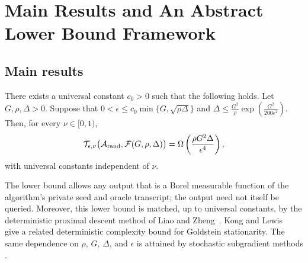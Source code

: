\section{Main Results and An Abstract Lower Bound Framework}
 \label{sec:main}
\subsection{Main results}
\begin{theorem}
\label{thm:main}
There exists a universal constant $c_0>0$ such that the following holds.
Let $G,\rho, \Delta>0$. Suppose that $0<\epsilon\le c_0\min\{G,\sqrt{\rho\Delta}\}$ and $\Delta\leq\tfrac{G^2}{\rho}
       \exp\left(\tfrac{G^2}{200\epsilon^2}\right)$. 
Then, for every $\nu\in[0,1)$,
\[
\mathcal T_{\epsilon,\nu}
\bigl(\mathcal A_{\operatorname{rand}},\mathcal F(G,\rho,\Delta)\bigr)
=
\Omega\left(\frac{\rho G^2\Delta}{\epsilon^4}\right),
\]
with universal  constants independent of $\nu$. 
\end{theorem}
The lower bound allows any output that is a Borel measurable
function of the algorithm's private seed and oracle transcript;
the output need not itself be queried.
Moreover, this lower bound is matched, up to universal constants, by
the deterministic proximal descent method of
Liao and Zheng~\citep[Theorem~2 and Corollary~4.2]{liao2025proximal}.
Kong and Lewis~\citep{kong2024cost} give a related deterministic
complexity bound for Goldstein stationarity.
The same dependence on $\rho$, $G$, $\Delta$, and $\epsilon$
is attained by stochastic subgradient methods
\citep{DavisDrusvyatskiy2019,davis2018stochastic}. 


